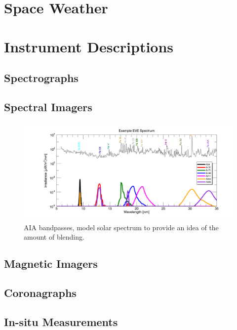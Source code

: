 \section{Space Weather}
\label{sec:spaceweather}

\section{Instrument Descriptions}
\label{sec:instruments}

\subsection{Spectrographs}

\subsection{Spectral Imagers}

\begin{figure}[!h]
    \begin{center}
	    \includegraphics[width=166mm]{Images/AiaBandpasses.png}
    \end{center}
    \caption[AIA bandpasses]{
	    AIA bandpasses, model solar spectrum to provide an idea of the amount of blending. 
	}
    \label{aiabandpasses}
\end{figure}

\subsection{Magnetic Imagers}

\subsection{Coronagraphs}

\subsection{In-situ Measurements}



